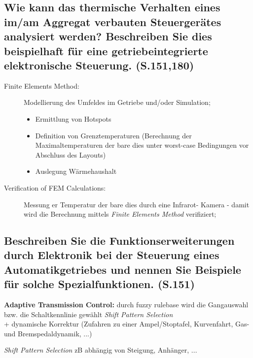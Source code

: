 \subsection{Wie kann das thermische Verhalten eines im/am Aggregat verbauten Steuerger\"ates analysiert werden? Beschreiben Sie dies beispielhaft f\"ur eine getriebeintegrierte elektronische Steuerung. (S.151,180)}
\begin{description}
\item[Finite Elements Method:] Modellierung des Umfeldes im Getriebe und/oder Simulation;
  \begin{itemize}
  \item Ermittlung von Hotspots
  \item Definition von Grenztemperaturen (Berechnung der Maximaltemperaturen der bare dies unter 
    worst-case Bedingungen vor Abschluss des Layouts)
  \item Auslegung Wärmehaushalt
  \end{itemize}
\item[Verification of FEM Calculations:] Messung er Temperatur der bare dies durch eine Infrarot-
  Kamera - damit wird die Berechnung mittels \emph{Finite Elements Method} verifiziert;
\end{description}

\subsection{Beschreiben Sie die Funktionserweiterungen durch Elektronik bei der Steuerung eines Automatikgetriebes und nennen Sie Beispiele f\"ur solche Spezialfunktionen. (S.151)}
{\bf Adaptive Transmission Control:} durch fuzzy rulebase wird die Gangauswahl bzw. die 
Schaltkennlinie gewählt \emph{Shift Pattern Selection} \\
+ dynamische Korrektur (Zufahren zu einer Ampel/Stoptafel, Kurvenfahrt, Gas- und 
Bremspedaldynamik, ...)

\emph{Shift Pattern Selection} zB abhängig von Steigung, Anhänger, ...

